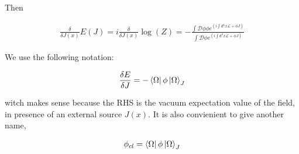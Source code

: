 \documentclass[11pt]{report}
\begin{document}
Then 

\begin{align}
    \frac{\delta}{\delta J(x)}E(J) = i\frac{\delta}{\delta J(x)}\log(Z)= -\frac{\int \mathcal{D}\phi \phi e^{\left(i \int d^4x \mathcal{L} + \phi J\right)}}{\int \mathcal{D}\phi e^{\left(i \int d^4x \mathcal{L} + \phi J\right)}}
\end{align}

We use the following notation: 

\begin{align}
    \frac{\delta E}{\delta J} = - \bra{\Omega}\phi\ket{\Omega}_J 
\end{align}

witch makes sense because the RHS is the vacuum expectation value of the field, in presence of an external source \(J(x)\). It is also convienient to give another name, 

\begin{align}
    \phi_{cl} = \bra{\Omega}\phi\ket{\Omega}_J 
\end{align}
\end{document}
